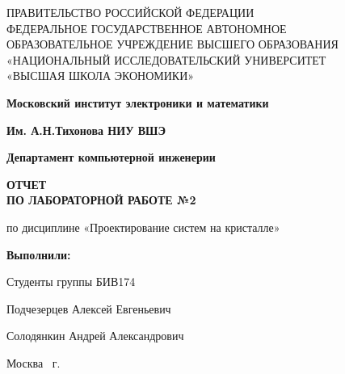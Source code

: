\begin{titlepage}
	\begin{center}
		ПРАВИТЕЛЬСТВО РОССИЙСКОЙ ФЕДЕРАЦИИ \\
 		ФЕДЕРАЛЬНОЕ  ГОСУДАРСТВЕННОЕ АВТОНОМНОЕ \\
		ОБРАЗОВАТЕЛЬНОЕ УЧРЕЖДЕНИЕ ВЫСШЕГО ОБРАЗОВАНИЯ\\
		«НАЦИОНАЛЬНЫЙ ИССЛЕДОВАТЕЛЬСКИЙ УНИВЕРСИТЕТ\\
		«ВЫСШАЯ ШКОЛА ЭКОНОМИКИ»
	\end{center}
	
	\begin{center}
		\textbf{Московский институт электроники и математики}
		
		\textbf{Им. А.Н.Тихонова НИУ ВШЭ}
		
		\vspace{2ex}
		
		\textbf{Департамент компьютерной инженерии}
	\end{center}
	\vspace{1ex}	
	
	\begin{center}
	\textbf{ОТЧЕТ\\
		ПО ЛАБОРАТОРНОЙ РАБОТЕ №2
	}
	\end{center}	
	\vspace{2ex}
	\begin{center}
		по дисциплине «Проектирование систем на кристалле»
	\end{center}	

	\vspace{2ex}

	\begin{flushright}
		\textbf{Выполнили:}
		
		\vspace{2ex}
		
		Студенты группы БИВ174
		
		\vspace{2ex}
		
		Подчезерцев Алексей Евгеньевич
		
		Солодянкин Андрей Александрович
		\vspace{2ex}
		
	\end{flushright}

	\vfill
	\begin{center}
		Москва \the\year \, г.
	\end{center}
	
\end{titlepage}
\addtocounter{page}{1}